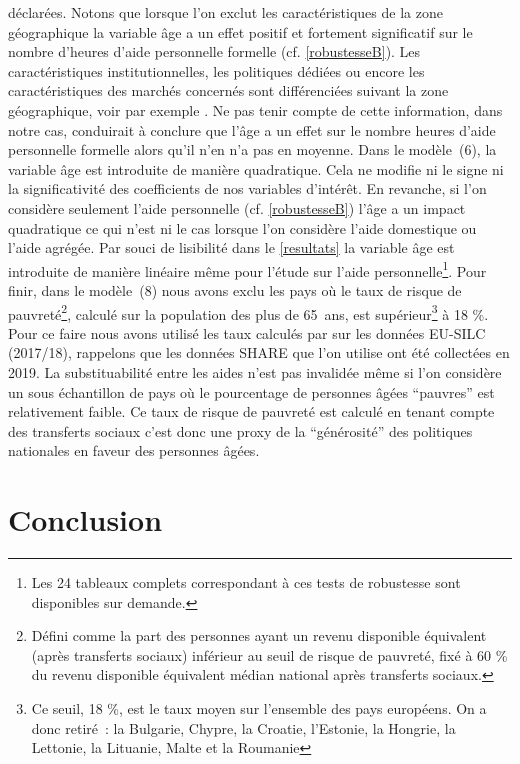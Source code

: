 \begin{Article}
\begin{refsection}[Bonnal]
déclarées. Notons que lorsque l'on exclut les caractéristiques de la zone géographique la variable âge a un effet positif et fortement significatif sur le nombre d'heures d'aide personnelle formelle (cf. \autoref{robustesseB}). Les caractéristiques institutionnelles, les politiques dédiées ou encore les caractéristiques des marchés concernés sont différenciées suivant la zone géographique, voir par exemple \textcite{rostgaard2011}. Ne pas tenir compte de cette information, dans notre cas, conduirait à conclure que l'âge a un effet sur le nombre heures d'aide personnelle formelle alors qu'il n'en n'a pas en moyenne. Dans le modèle~(6), la variable âge est introduite de manière quadratique. Cela ne modifie ni le signe ni la significativité des coefficients de nos variables d'intérêt. En revanche, si l'on considère seulement l'aide personnelle (cf. \autoref{robustesseB}) l'âge a un impact quadratique ce qui n'est ni le cas lorsque l'on considère l'aide domestique ou l'aide agrégée. Par souci de lisibilité dans le \autoref{resultats} la variable âge est introduite de manière linéaire même pour l'étude sur l'aide personnelle\footnote{Les 24 tableaux complets correspondant à ces tests de robustesse sont disponibles sur demande.}. Pour finir, dans le modèle~(8) nous avons exclu les pays où le taux de risque de pauvreté\footnote{Défini comme la part des personnes ayant un revenu disponible équivalent (après transferts sociaux) inférieur au seuil de risque de pauvreté, fixé à 60 \% du revenu disponible équivalent médian national après transferts sociaux.}, calculé sur la population des plus de 65~ans, est supérieur\footnote{Ce seuil, 18 \%, est le taux moyen sur l'ensemble des pays européens. On a donc retiré~: la Bulgarie, Chypre, la Croatie, l'Estonie, la Hongrie, la Lettonie, la Lituanie, Malte et la Roumanie} à 18 \%. Pour ce faire nous avons utilisé les taux calculés par \textcite{ebbinghaus2021} sur les données EU-SILC (2017/18), rappelons que les données SHARE que l'on utilise ont été collectées en 2019. La substituabilité entre les aides n'est pas invalidée même si l'on considère un sous échantillon de pays où le pourcentage de personnes âgées \enquote{pauvres} est relativement faible. Ce taux de risque de pauvreté est calculé en tenant compte des transferts sociaux c'est donc une proxy de la \enquote{générosité} des politiques nationales en faveur des personnes âgées.

						\section{Conclusion}


\end{refsection}
\end{Article}
